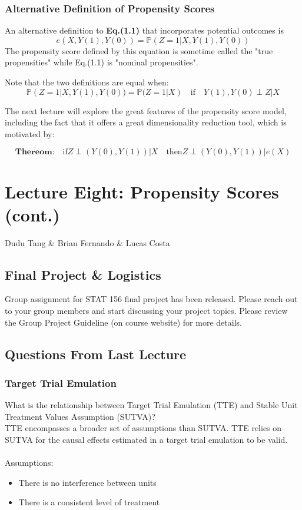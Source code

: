 \subsubsection{Alternative Definition of Propensity Scores}
An alternative definition to \textbf{Eq.(1.1)} that incorporates potential outcomes is
\begin{equation}
    e(X, Y(1), Y(0)) = \mathbb{P}(Z=1|X,Y(1),Y(0))
\end{equation}
The propensity score defined by this equation is sometime called the "true propensities" while Eq.(1.1) is "nominal propensities".

Note that the two definitions are equal when:
\[
\mathbb{P}(Z=1|X,Y(1),Y(0)) = \mathbb{P}(Z=1|X) \quad \text{if} \quad Y(1),Y(0) \perp Z|X
\]

The next lecture will explore the great features of the propensity score model, including the fact that it offers a great dimensionality reduction tool, which is motivated by:

\[
\textbf{Thereom:} \quad \text{if} Z \perp (Y(0),Y(1)) | X \quad \text{then} Z \perp (Y(0),Y(1)) | e(X) 
\]

\section{Lecture Eight: Propensity Scores (cont.)}
{Dudu Tang \& Brian Fernando \& Lucas Costa}

\subsection{Final Project \& Logistics}

Group assignment for STAT 156 final project has been released. Please reach out to your group members and start discussing your project topics. Please review the Group Project Guideline (on course website) for more details. 

\subsection{Questions From Last Lecture}
\subsubsection{Target Trial Emulation}
    What is the relationship between Target Trial Emulation (TTE) and Stable Unit Treatment Values Assumption (SUTVA)?\\
    TTE encompasses a broader set of assumptions than SUTVA. TTE relies on SUTVA for the causal effects estimated in a target trial emulation to be valid. \\\\
    Assumptions:
    \begin{itemize}
        \item There is no interference between units
        \item There is a consistent level of treatment
    \end{itemize}

